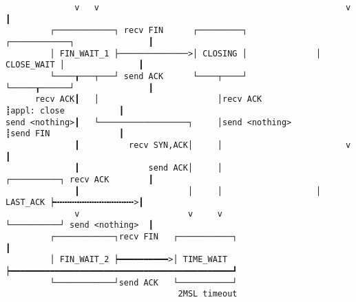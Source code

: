 \documentclass[varwidth=60em,crop]{standalone}
\begin{document}
\begin{verbatim}
              v   v                                                  v                      ┃
         ┌────────────┐ recv FIN      ┌─────────┐              ┌────────────┐               ┃
         │ FIN_WAIT_1 ├──────────────>│ CLOSING │              │ CLOSE_WAIT │               ┃
         └────┰───┬───┘ send ACK      └────┬────┘              └─────┰──────┘               ┃
      recv ACK┃   │                        │recv ACK                 ┋appl: close           ┃
send <nothing>┃   └──────────────────┐     │send <nothing>           ┋send FIN              ┃
              ┃          recv SYN,ACK│     │                         v                      ┃
              ┃              send ACK│     │                   ┌──────────┐ recv ACK        ┃
              ┃                      │     │                   │ LAST_ACK ┝╍╍╍╍╍╍╍╍╍╍╍╍╍╍╍╍>┃
              v                      v     v                   └──────────┘ send <nothing>  ┃
         ┌────────────┐recv FIN   ┌───────────┐                                             ┃
         │ FIN_WAIT_2 ┝━━━━━━━━━━>│ TIME_WAIT ┝━━━━━━━━━━━━━━━━━━━━━━━━━━━━━━━━━━━━━━━━━━━━━┛
         └────────────┘send ACK   └───────────┘
                                   2MSL timeout
\end{verbatim}
\end{document}

